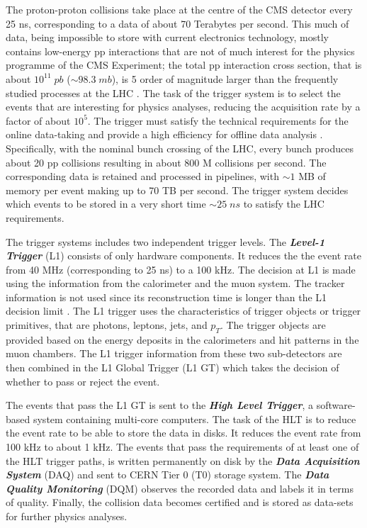 The proton-proton collisions take place at the centre of the CMS detector every 25 ns, corresponding to a data of about 70 Terabytes per second. This much of data, being impossible to store with current electronics technology, mostly contains low-energy pp interactions that are not of much interest for the physics programme of the CMS Experiment; the total pp interaction cross section, that is about $10^{11} \; pb$ ($\sim98.3 \; mb$), is 5 order of magnitude larger than the frequently studied processes at the LHC \cite{ppxsec}. The task of the trigger system is to select the events that are interesting for physics analyses, reducing the acquisition rate by a factor of about $10^5$. The trigger must satisfy the technical requirements for the online data-taking and provide a high efficiency for offline data analysis \cite{Khachatryan_2017}. Specifically, with the nominal bunch crossing of the LHC, every bunch produces about 20 pp collisions resulting in about 800 M collisions per second. The corresponding data is retained and processed in pipelines, with $\sim1$ MB of memory per event making up to 70 TB per second. The trigger system decides which events to be stored in a very short time $\sim 25 \; ns$ to satisfy the LHC requirements.

The trigger systems includes two independent trigger levels. The \emph{\textbf{Level-1 Trigger}} (L1) consists of only hardware components. It reduces the the event rate from 40 MHz (corresponding to 25 ns) to a 100 kHz. The decision at L1 is made using the information from the calorimeter and the muon system. The tracker information is not used since its reconstruction time is longer than the L1 decision limit \cite{Cittolin:578006}. The L1 trigger uses the characteristics of trigger objects or trigger primitives, that are photons, leptons, jets, and $p_T$. The trigger objects are provided based on the energy deposits in the calorimeters and hit patterns in the muon chambers. The L1 trigger information from these two sub-detectors are then combined in the L1 Global Trigger (L1 GT) which takes the decision of whether to pass or reject the event.

The events that pass the L1 GT is sent to the \emph{\textbf{High Level Trigger}}, a software-based system containing multi-core computers. The task of the HLT is to reduce the event rate to be able to store the data in disks. It reduces the event rate from 100 kHz to about 1 kHz. The events that pass the requirements of at least one of the HLT trigger paths, is written permanently on disk by the \emph{\textbf{Data Acquisition System}} (DAQ) and sent to CERN Tier 0 (T0) storage system. The \emph{\textbf{Data Quality Monitoring}} (DQM) observes the recorded data and labels it in terms of quality. Finally, the collision data becomes certified and is stored as data-sets for further physics analyses.

